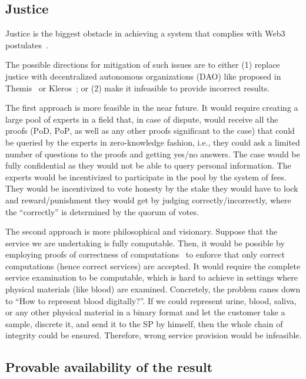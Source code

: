 \documentclass{ieeeaccess}
\begin{document}
\subsection{Justice}\label{justice}

Justice is the biggest obstacle in achieving a system that complies with Web3 postulates~\cite{Web3Wiki71}.

The possible directions for mitigation of such issues are to either (1) replace justice with decentralized autonomous organizations (DAO) like proposed in Themis~\cite{meng2019themis} or Kleros~\cite{lesaege2018kleros}; or (2) make it infeasible to provide incorrect results.

The first approach is more feasible in the near future. It would require creating a large pool of experts in a field that, in case of dispute, would receive all the proofs ($\mathrm{PoD}$, $\mathrm{PoP}$, as well as any other proofs significant to the case) that could be queried by the experts in zero-knowledge fashion, i.e., they could ask a limited number of questions to the proofs and getting yes/no answers. The case would be fully confidential as they would not be able to query personal information. The experts would be incentivized to participate in the pool by the system of fees. They would be incentivized to vote honesty by the stake they would have to lock and reward/punishment they would get by judging correctly/incorrectly, where the ``correctly'' is determined by the quorum of votes.

The second approach is more philosophical and visionary. Suppose that the service we are undertaking is fully computable. Then, it would be possible by employing proofs of correctness of computations~\cite{ben2013snarks} to enforce that only correct computations (hence correct services) are accepted. It would require the complete service examination to be computable, which is hard to achieve in settings where physical materials (like blood) are examined. Concretely, the problem canes down to ``How to represent blood digitally?''. If we could represent urine, blood, saliva, or any other physical material in a binary format and let the customer take a sample, discrete it, and send it to the SP by himself, then the whole chain of integrity could be ensured. Therefore, wrong service provision would be infeasible.


\subsection{Provable availability of the
result}\label{cryptographically-provable-availability-of-results}
\end{document}
